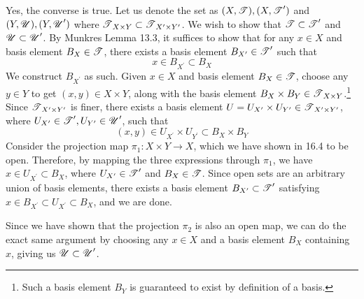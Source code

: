   \begin{solution}[Munkres 16.5.b]
    Yes, the converse is true. Let us denote the set as $(X,\T), (X, \T^\prime)$ and $(Y, \U), (Y, \U^\prime)$ where $\T_{X \times Y} \subset \T_{X^\prime \times Y^\prime}$. We wish to show that $\T \subset \T^\prime$ and $\U \subset \U^\prime$. By Munkres Lemma 13.3, it suffices to show that for any $x \in X$ and basis element $B_X \in \T$, there exists a basis element $B_{X^\prime} \in \T^\prime$ such that 
    \begin{equation}
      x \in B_{X^\prime} \subset B_X
    \end{equation} 
    We construct $B_{X^\prime}$ as such. Given $x \in X$ and basis element $B_X \in \T$, choose any $y \in Y$ to get $(x, y) \in X \times Y$, along with the basis element $B_X \times B_Y \in \T_{X \times Y}$.\footnote{Such a basis element $B_Y$ is guaranteed to exist by definition of a basis.} Since $\T_{X^\prime \times Y^\prime}$ is finer, there exists a basis element $U = U_{X^\prime} \times U_{Y^\prime} \in \T_{X^\prime \times Y^\prime}$, where $U_{X^\prime} \in \T^\prime, U_{Y^\prime} \in \U^\prime$, such that 
    \begin{equation}
      (x, y) \in U_{X^\prime} \times U_{Y^\prime} \subset B_X \times B_Y
    \end{equation} 
    Consider the projection map $\pi_1: X \times Y \rightarrow X$, which we have shown in 16.4 to be open. Therefore, by mapping the three expressions through $\pi_1$, we have $x \in U_{X^\prime} \subset B_X$, where $U_{X^\prime} \in \T^\prime$ and $B_X \in \T$. Since open sets are an arbitrary union of basis elements, there exists a basis element $B_{X^\prime} \subset \T^\prime$ satisfying $x \in B_{X^\prime} \subset U_{X^\prime} \subset B_{X}$, and we are done. 

    Since we have shown that the projection $\pi_2$ is also an open map, we can do the exact same argument by choosing any $x \in X$ and a basis element $B_X$ containing $x$, giving us $\U \subset \U^\prime$. 
  \end{solution}

